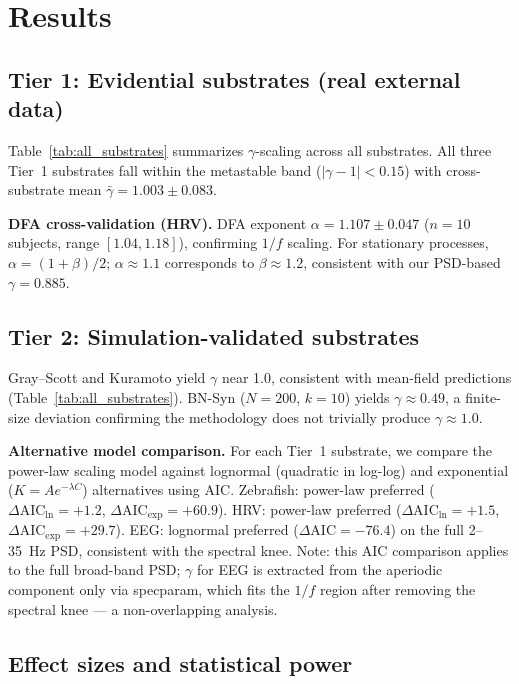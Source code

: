\documentclass[11pt,a4paper,twocolumn]{article}
\begin{document}
\section{Results}

\subsection{Tier 1: Evidential substrates (real external data)}

Table~\ref{tab:all_substrates} summarizes $\gamma$-scaling across all substrates. All three Tier~1 substrates fall within the metastable band ($|\gamma - 1| < 0.15$) with cross-substrate mean $\bar{\gamma} = 1.003 \pm 0.083$.

\textbf{DFA cross-validation (HRV).} DFA exponent $\alpha = 1.107 \pm 0.047$ ($n = 10$ subjects, range $[1.04, 1.18]$), confirming $1/f$ scaling. For stationary processes, $\alpha = (1 + \beta)/2$; $\alpha \approx 1.1$ corresponds to $\beta \approx 1.2$, consistent with our PSD-based $\gamma = 0.885$.

\subsection{Tier 2: Simulation-validated substrates}

Gray--Scott and Kuramoto yield $\gamma$ near 1.0, consistent with mean-field predictions (Table~\ref{tab:all_substrates}). BN-Syn ($N\!=\!200$, $k\!=\!10$) yields $\gamma \approx 0.49$, a finite-size deviation confirming the methodology does not trivially produce $\gamma \approx 1.0$.

\textbf{Alternative model comparison.} For each Tier~1 substrate, we compare the power-law scaling model against lognormal (quadratic in log-log) and exponential ($K = A e^{-\lambda C}$) alternatives using AIC. Zebrafish: power-law preferred ($\Delta\text{AIC}_{\text{ln}} = +1.2$, $\Delta\text{AIC}_{\text{exp}} = +60.9$). HRV: power-law preferred ($\Delta\text{AIC}_{\text{ln}} = +1.5$, $\Delta\text{AIC}_{\text{exp}} = +29.7$). EEG: lognormal preferred ($\Delta\text{AIC} = -76.4$) on the full 2--35~Hz PSD, consistent with the spectral knee. Note: this AIC comparison applies to the full broad-band PSD; $\gamma$ for EEG is extracted from the aperiodic component only via specparam, which fits the $1/f$ region after removing the spectral knee --- a non-overlapping analysis.

\subsection{Effect sizes and statistical power}
\end{document}

